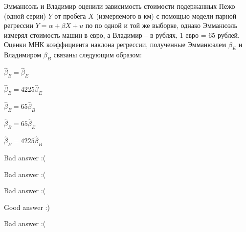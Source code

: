
\begin{question}
Эмманюэль и Владимир оценили зависимость стоимости подержанных Пежо (одной серии) \(Y\)
от пробега \(X\) (измеряемого в км) с помощью модели парной регрессии \(Y = \alpha + \beta X + u\) по по одной и той же выборке,
однако Эмманюэль измерял стоимость машин в евро, а Владимир -- в рублях, 1 евро = 65 рублей.
Оценки МНК коэффициента наклона регрессии, полученные Эмманюэлем \(\beta_E\) и Владимиром \(\beta_B\) связаны следующим образом:
\begin{answerlist}
  \item \(\hat \beta_B = \hat \beta_E\)
  \item \(\hat \beta_B = 4225 \hat \beta_E\)
  \item \(\hat \beta_E = 65 \hat \beta_B\)
  \item \(\hat \beta_B = 65 \hat \beta_E\)
  \item \(\hat \beta_E = 4225 \hat \beta_B\)
\end{answerlist}
\end{question}

\begin{solution}
\begin{answerlist}
  \item Bad answer :(
  \item Bad answer :(
  \item Bad answer :(
  \item Good answer :)
  \item Bad answer :(
\end{answerlist}
\end{solution}

